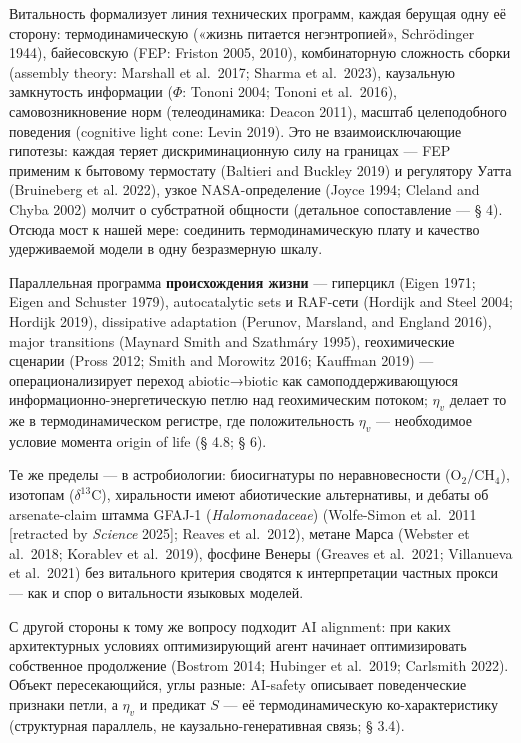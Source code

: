 \documentclass[pdflatex,sn-mathphys-ay]{sn-jnl}
\begin{document}
Витальность формализует линия технических программ, каждая берущая одну её сторону: термодинамическую («жизнь питается негэнтропией», Schrödinger 1944), байесовскую (FEP: Friston 2005, 2010), комбинаторную сложность сборки (assembly theory: Marshall et al.~2017; Sharma et al.~2023), каузальную замкнутость информации (\(\Phi\): Tononi 2004; Tononi et al.~2016), самовозникновение норм (телеодинамика: Deacon 2011), масштаб целеподобного поведения (cognitive light cone: Levin 2019). Это не взаимоисключающие гипотезы: каждая теряет дискриминационную силу на границах --- FEP применим к бытовому термостату (Baltieri and Buckley 2019) и регулятору Уатта (Bruineberg et al. 2022), узкое NASA-определение (Joyce 1994; Cleland and Chyba 2002) молчит о субстратной общности (детальное сопоставление --- § 4). Отсюда мост к нашей мере: соединить термодинамическую плату и качество удерживаемой модели в одну безразмерную шкалу.

Параллельная программа \textbf{происхождения жизни} --- гиперцикл (Eigen 1971; Eigen and Schuster 1979), autocatalytic sets и RAF-сети (Hordijk and Steel 2004; Hordijk 2019), dissipative adaptation (Perunov, Marsland, and England 2016), major transitions (Maynard Smith and Szathmáry 1995), геохимические сценарии (Pross 2012; Smith and Morowitz 2016; Kauffman 2019) --- операционализирует переход abiotic→biotic как самоподдерживающуюся информационно-энергетическую петлю над геохимическим потоком; \(\eta_v\) делает то же в термодинамическом регистре, где положительность \(\eta_v\) --- необходимое условие момента origin of life (§ 4.8; § 6).

Те же пределы --- в астробиологии: биосигнатуры по неравновесности (\(\text{O}_2\)/\(\text{CH}_4\)), изотопам (\(\delta^{13}\text{C}\)), хиральности имеют абиотические альтернативы, и дебаты об arsenate-claim штамма GFAJ-1 (\emph{Halomonadaceae}) (Wolfe-Simon et al.~2011 {[}retracted by \emph{Science} 2025{]}; Reaves et al.~2012), метане Марса (Webster et al.~2018; Korablev et al.~2019), фосфине Венеры (Greaves et al.~2021; Villanueva et al.~2021) без витального критерия сводятся к интерпретации частных прокси --- как и спор о витальности языковых моделей.

С другой стороны к тому же вопросу подходит AI alignment: при каких архитектурных условиях оптимизирующий агент начинает оптимизировать собственное продолжение (Bostrom 2014; Hubinger et al.~2019; Carlsmith 2022). Объект пересекающийся, углы разные: AI-safety описывает поведенческие признаки петли, а \(\eta_v\) и предикат \(S\) --- её термодинамическую ко-характеристику (структурная параллель, не каузально-генеративная связь; § 3.4).
\end{document}
